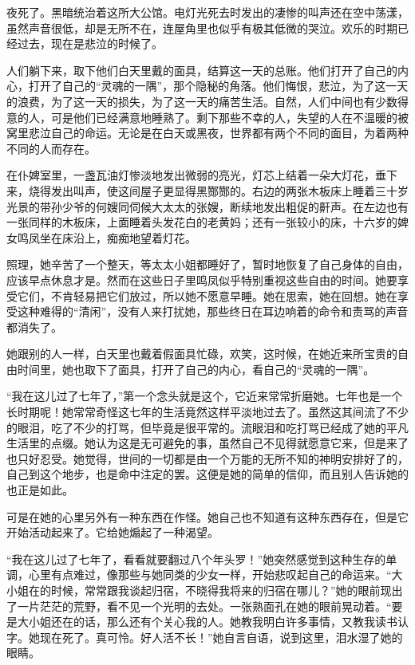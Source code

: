 \par 夜死了。黑暗统治着这所大公馆。电灯光死去时发出的凄惨的叫声还在空中荡漾，虽然声音很低，却是无所不在，连屋角里也似乎有极其低微的哭泣。欢乐的时期已经过去，现在是悲泣的时候了。
\par 人们躺下来，取下他们白天里戴的面具，结算这一天的总账。他们打开了自己的内心，打开了自己的“灵魂的一隅”，那个隐秘的角落。他们悔恨，悲泣，为了这一天的浪费，为了这一天的损失，为了这一天的痛苦生活。自然，人们中间也有少数得意的人，可是他们已经满意地睡熟了。剩下那些不幸的人，失望的人在不温暖的被窝里悲泣自己的命运。无论是在白天或黑夜，世界都有两个不同的面目，为着两种不同的人而存在。
\par 在仆婢室里，一盏瓦油灯惨淡地发出微弱的亮光，灯芯上结着一朵大灯花，垂下来，烧得发出叫声，使这间屋子更显得黑酂酂的。右边的两张木板床上睡着三十岁光景的带孙少爷的何嫂同伺候大太太的张嫂，断续地发出粗促的鼾声。在左边也有一张同样的木板床，上面睡着头发花白的老黄妈；还有一张较小的床，十六岁的婢女鸣凤坐在床沿上，痴痴地望着灯花。
\par 照理，她辛苦了一个整天，等太太小姐都睡好了，暂时地恢复了自己身体的自由，应该早点休息才是。然而在这些日子里鸣凤似乎特别重视这些自由的时间。她要享受它们，不肯轻易把它们放过，所以她不愿意早睡。她在思索，她在回想。她在享受这种难得的“清闲”，没有人来打扰她，那些终日在耳边响着的命令和责骂的声音都消失了。
\par 她跟别的人一样，白天里也戴着假面具忙碌，欢笑，这时候，在她近来所宝贵的自由时间里，她也取下了面具，打开了自己的内心，看自己的“灵魂的一隅”。
\par “我在这儿过了七年了，”第一个念头就是这个，它近来常常折磨她。七年也是一个长时期呢！她常常奇怪这七年的生活竟然这样平淡地过去了。虽然这其间流了不少的眼泪，吃了不少的打骂，但毕竟是很平常的。流眼泪和吃打骂已经成了她的平凡生活里的点缀。她认为这是无可避免的事，虽然自己不见得就愿意它来，但是来了也只好忍受。她觉得，世间的一切都是由一个万能的无所不知的神明安排好了的，自己到这个地步，也是命中注定的罢。这便是她的简单的信仰，而且别人告诉她的也正是如此。
\par 可是在她的心里另外有一种东西在作怪。她自己也不知道有这种东西存在，但是它开始活动起来了。它给她煽起了一种渴望。
\par “我在这儿过了七年了，看看就要翻过八个年头罗！”她突然感觉到这种生存的单调，心里有点难过，像那些与她同类的少女一样，开始悲叹起自己的命运来。“大小姐在的时候，常常跟我谈起归宿，不晓得我将来的归宿在哪儿？”她的眼前现出了一片茫茫的荒野，看不见一个光明的去处。一张熟面孔在她的眼前晃动着。“要是大小姐还在的话，那么还有个关心我的人。她教我明白许多事情，又教我读书认字。她现在死了。真可怜。好人活不长！”她自言自语，说到这里，泪水湿了她的眼睛。
